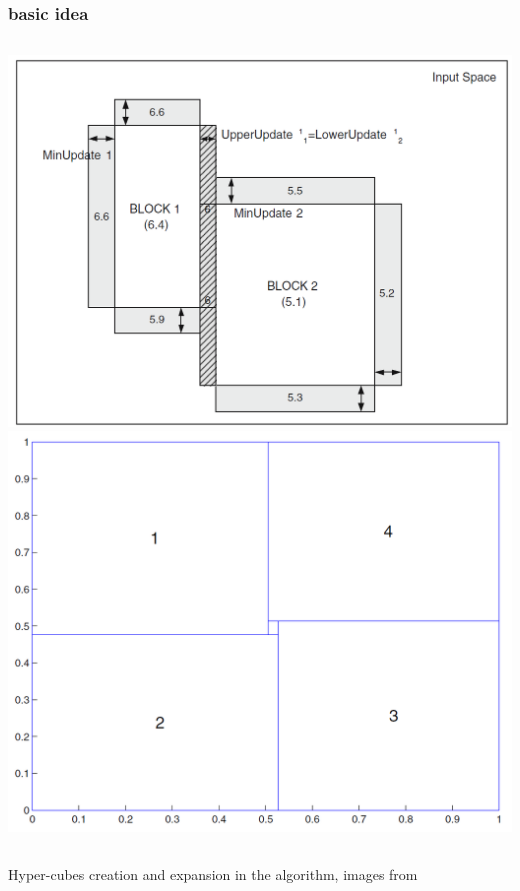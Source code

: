 \documentclass[presentation]{beamer}
\begin{document}
\begin{frame}%
\frametitle{\iter basic idea}
	\begin{columns}[t]
			\centering
			\includegraphics[width = \columnwidth]{img/cubes.png}
			\centering
			\includegraphics[width = \columnwidth]{img/iter.png}
	\end{columns}
	\centering
	Hyper-cubes creation and expansion in the \iter algorithm, images from 
\end{frame}
\end{document}
